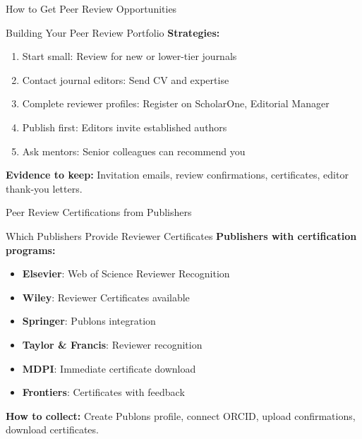 \documentclass[11pt]{beamer}
\begin{document}
	
	\begin{frame}{How to Get Peer Review Opportunities}
		\small
		\begin{block}{Building Your Peer Review Portfolio}
			\textbf{Strategies:}
			\begin{enumerate}
				\item Start small: Review for new or lower-tier journals
				\item Contact journal editors: Send CV and expertise
				\item Complete reviewer profiles: Register on ScholarOne, Editorial Manager
				\item Publish first: Editors invite established authors
				\item Ask mentors: Senior colleagues can recommend you
			\end{enumerate}
			\textbf{Evidence to keep:} Invitation emails, review confirmations, certificates, editor thank-you letters.
		\end{block}
	\end{frame}
	
	\begin{frame}{Peer Review Certifications from Publishers}
		\small
		\begin{block}{Which Publishers Provide Reviewer Certificates}
			\textbf{Publishers with certification programs:}
			\begin{itemize}
				\item \textbf{Elsevier}: Web of Science Reviewer Recognition
				\item \textbf{Wiley}: Reviewer Certificates available
				\item \textbf{Springer}: Publons integration
				\item \textbf{Taylor \& Francis}: Reviewer recognition
				\item \textbf{MDPI}: Immediate certificate download
				\item \textbf{Frontiers}: Certificates with feedback
			\end{itemize}
			\textbf{How to collect:} Create Publons profile, connect ORCID, upload confirmations, download certificates.
		\end{block}
	\end{frame}
	
\end{document}
